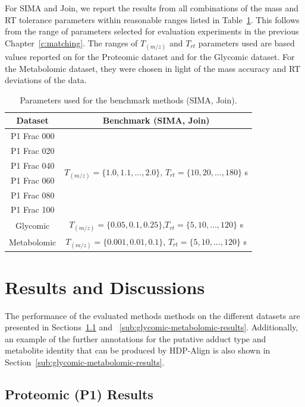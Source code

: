 For SIMA and Join, we report the results from all combinations of the mass and RT tolerance parameters within reasonable ranges listed in Table~\ref{tab:hdp-parameters-benchmark}. This follows from the range of parameters selected for evaluation experiments in the previous Chapter~\ref{c:matching}. The ranges of $T_{(m/z)}$ and $T_{rt}$ parameters used are based values reported on \cite{Lange2008} for the Proteomic dataset and \cite{Tsai2013a} for the Glycomic dataset. For the Metabolomic dataset, they were chosen in light of the mass accuracy and RT deviations of the data.

\begin{table}[!htbp]
\begin{centering}
\begin{tabular}{|c|c|}
\hline 
Dataset & Benchmark (SIMA, Join)\tabularnewline
\hline 
\hline 
P1 Frac 000 & \multirow{6}{*}{$T_{(m/z)}=\{1.0,1.1,...,2.0\}$, $T{}_{rt}=\{10,20,...,180\}$ s}\tabularnewline
\cline{1-1} 
P1 Frac 020 & \tabularnewline
\cline{1-1} 
P1 Frac 040 & \tabularnewline
\cline{1-1} 
P1 Frac 060 & \tabularnewline
\cline{1-1} 
P1 Frac 080 & \tabularnewline
\cline{1-1} 
P1 Frac 100 & \tabularnewline
\hline 
Glycomic & $T_{(m/z)}=\{0.05,0.1,0.25\}$,$T{}_{rt}=\{5,10,...,120\}$ s\tabularnewline
\hline 
Metabolomic & $T_{(m/z)}=\{0.001,0.01,0.1\}$, $T{}_{rt}=\{5,10,...,120\}$ s\tabularnewline
\hline 
\end{tabular}
\par\end{centering}
\caption{Parameters used for the benchmark methods (SIMA, Join).\label{tab:hdp-parameters-benchmark}}
\end{table}

\section{Results and Discussions}

The performance of the evaluated methods methods on the different datasets are presented in Sections~\ref{sub:proteomic-results} and ~\ref{sub:glycomic-metabolomic-results}. Additionally, an example of the further annotations for the putative adduct type and metabolite identity that can be produced by HDP-Align is also shown in Section~\ref{sub:glycomic-metabolomic-results}. 

\subsection{Proteomic (P1) Results}
\label{sub:proteomic-results}

